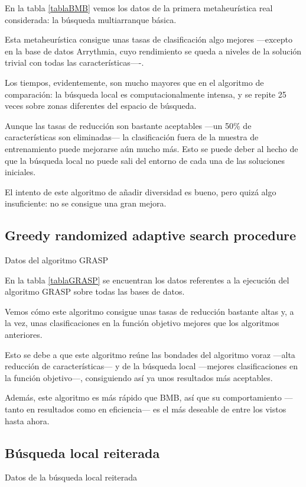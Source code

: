 \documentclass[a4paper, 11pt, titlepage]{article}
\begin{document}
    En la tabla \ref{tablaBMB} vemos los datos de la primera metaheurística real considerada: la búsqueda multiarranque básica.

    Esta metaheurística consigue unas tasas de clasificación algo mejores ---excepto en la base de datos Arrythmia, cuyo rendimiento se queda a niveles de la solución trivial con todas las características----.

    Los tiempos, evidentemente, son mucho mayores que en el algoritmo de comparación: la búsqueda local es computacionalmente intensa, y se repite 25 veces sobre zonas diferentes del espacio de búsqueda.

    Aunque las tasas de reducción son bastante aceptables ---un 50\% de características son eliminadas--- la clasificación fuera de la muestra de entrenamiento puede mejorarse aún mucho más. Esto se puede deber al hecho de que la búsqueda local no puede sali del entorno de cada una de las soluciones iniciales.

    El intento de este algoritmo de añadir diversidad es bueno, pero quizá algo insuficiente: no se consigue una gran mejora.

    \subsection{Greedy randomized adaptive search procedure}
    \begin{table}[!htb]
        \maketable{\dataGRASP}
        \caption{Datos del algoritmo GRASP}
        \label{tablaGRASP}
    \end{table}

    En la tabla \ref{tablaGRASP} se encuentran los datos referentes a la ejecución del algoritmo GRASP sobre todas las bases de datos.

    Vemos cómo este algoritmo consigue unas tasas de reducción bastante altas y, a la vez, unas clasificaciones en la función objetivo mejores que los algoritmos anteriores.

    Esto se debe a que este algoritmo reúne las bondades del algoritmo voraz ---alta reducción de características--- y de la búsqueda local ---mejores clasificaciones en la función objetivo---, consiguiendo así ya unos resultados más aceptables.

    Además, este algoritmo es más rápido que BMB, así que su comportamiento ---tanto en resultados como en eficiencia--- es el más deseable de entre los vistos hasta ahora.


    \subsection{Búsqueda local reiterada}
    \begin{table}[!htb]
        \maketable{\dataILS}
        \caption{Datos de la búsqueda local reiterada}
        \label{tablaILS}
    \end{table}
\end{document}
